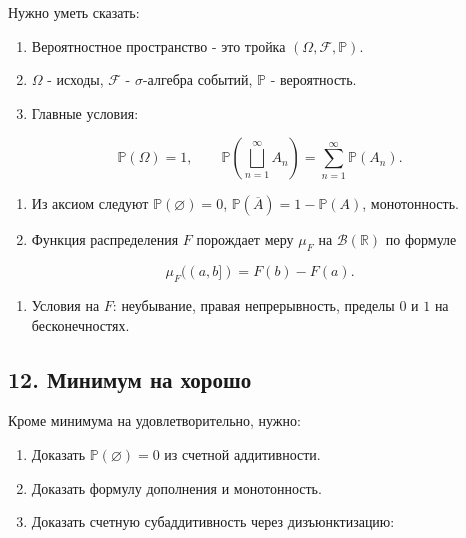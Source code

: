 \documentclass[
  11pt,
  a4paper,
]{article}
\providecommand{\tightlist}{%
  \setlength{\itemsep}{0pt}\setlength{\parskip}{0pt}}
\begin{document}
Нужно уметь сказать:

\begin{enumerate}
\def\labelenumi{\arabic{enumi}.}
\tightlist
\item
  Вероятностное пространство - это тройка
  \((\Omega,\mathcal F,\mathbb P)\).
\item
  \(\Omega\) - исходы, \(\mathcal F\) - \(\sigma\)-алгебра событий,
  \(\mathbb P\) - вероятность.
\item
  Главные условия:
\end{enumerate}

\[
\mathbb P(\Omega)=1,
\qquad
\mathbb P\left(\bigsqcup_{n=1}^{\infty}A_n\right)
=
\sum_{n=1}^{\infty}\mathbb P(A_n).
\]

\begin{enumerate}
\def\labelenumi{\arabic{enumi}.}
\setcounter{enumi}{3}
\tightlist
\item
  Из аксиом следуют \(\mathbb P(\varnothing)=0\),
  \(\mathbb P(\overline{A})=1-\mathbb P(A)\), монотонность.
\item
  Функция распределения \(F\) порождает меру \(\mu_F\) на
  \(\mathcal B(\mathbb R)\) по формуле
\end{enumerate}

\[
\mu_F((a,b])=F(b)-F(a).
\]

\begin{enumerate}
\def\labelenumi{\arabic{enumi}.}
\setcounter{enumi}{5}
\tightlist
\item
  Условия на \(F\): неубывание, правая непрерывность, пределы \(0\) и
  \(1\) на бесконечностях.
\end{enumerate}

\subsection{12. Минимум на
хорошо}\label{ux43cux438ux43dux438ux43cux443ux43c-ux43dux430-ux445ux43eux440ux43eux448ux43e}

Кроме минимума на удовлетворительно, нужно:

\begin{enumerate}
\def\labelenumi{\arabic{enumi}.}
\tightlist
\item
  Доказать \(\mathbb P(\varnothing)=0\) из счетной аддитивности.
\item
  Доказать формулу дополнения и монотонность.
\item
  Доказать счетную субаддитивность через дизъюнктизацию:
\end{enumerate}
\end{document}
